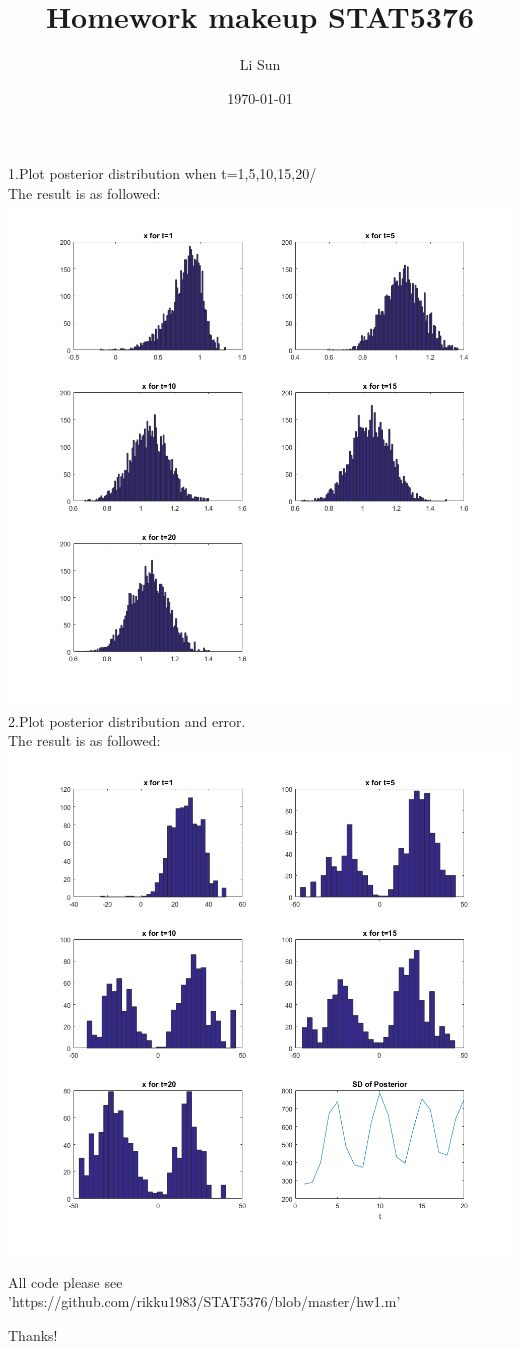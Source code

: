 \documentclass[11pt]{article}
\begin{document}
\title{Homework makeup STAT5376}
\author{Li Sun}
\date{\today}
\maketitle

\noindent
1.Plot posterior distribution when t=1,5,10,15,20/\\
The result is as followed:\\
\includegraphics[scale=0.66]{mkhw1.png}\\
2.Plot posterior distribution and error.\\
The result is as followed:\\
\includegraphics[scale=0.66]{mkhw2.png}
\bigskip

All code please see 'https://github.com/rikku1983/STAT5376/blob/master/hw1.m'\\
\bigskip

Thanks!
\end{document}
